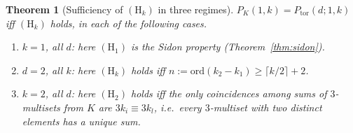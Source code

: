 \documentclass[11pt]{article}
\newcommand{\Ptor}{P_{\mathrm{tor}}}
\newtheorem{theorem}{Theorem}
\theoremstyle{definition}
\theoremstyle{remark}
\begin{document}
\begin{theorem}[Sufficiency of $(\mathrm H_k)$ in three regimes]\label{thm:t1suff}
$P_K(1,k)=\Ptor(d;1,k)$ iff $(\mathrm H_k)$ holds, in each of the following cases.
\begin{enumerate}
\item[(a)] $k=1$, all $d$: here $(\mathrm H_1)$ is the Sidon property (Theorem~\ref{thm:sidon}).
\item[(b)] $d=2$, all $k$: here $(\mathrm H_k)$ holds iff $n:=\mathrm{ord}(k_2-k_1)\ge\lceil k/2\rceil+2$.
\item[(c)] $k=2$, all $d$: here $(\mathrm H_2)$ holds iff the only coincidences among sums of $3$-multisets from $K$ are
$3k_i\equiv3k_l$, i.e.\ every $3$-multiset with two distinct elements has a unique sum.
\end{enumerate}
\end{theorem}
\end{document}
